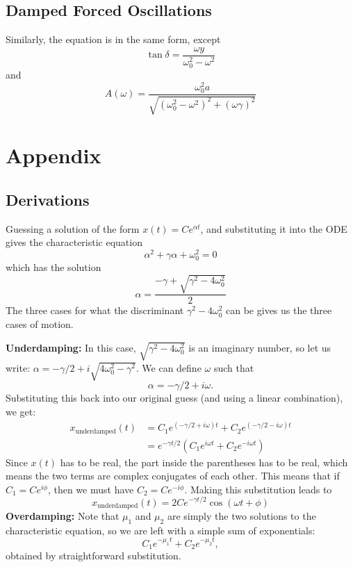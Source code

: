 \documentclass{article}
\begin{document}
\subsection{Damped Forced Oscillations}
Similarly, the equation is in the same form, except 
\begin{equation}
    \tan\delta = \frac{\omega y}{\omega_0^2-\omega^2}
\end{equation}
and 
\begin{equation}
    A(\omega) = \frac{\omega_0^2 a}{\sqrt{(\omega_0^2-\omega^2)^2 + (\omega \gamma)^2}}
\end{equation}
\section{Appendix}
\subsection{Derivations}
Guessing a solution of the form $x(t)=Ce^{\alpha t}$, and substituting it into the ODE gives the characteristic equation 
\begin{equation}
    \alpha^2 + \gamma \alpha + \omega_0^2 = 0
\end{equation}
which has the solution 
\begin{equation}
    \alpha = \frac{-\gamma + \sqrt{\gamma^2 - 4\omega_0^2}}{2}
\end{equation}
The three cases for what the discriminant $\gamma^2-4\omega_0^2$ can be gives us the three cases of motion.

\textbf{Underdamping:} In this case, $\sqrt{\gamma^2-4\omega_0^2}$ is an imaginary number, so let us write: $\alpha = -\gamma/2 + i\sqrt{4\omega_0^2-\gamma^2}$. We can define $\omega$ such that 
\begin{equation}
    \alpha = -\gamma/2 + i\omega.
\end{equation}
Substituting this back into our original guess (and using a linear combination), we get: 
\begin{align}
    x_\text{underdamped}(t) &= C_1e^{(-\gamma/2 + i\omega)t}+C_2e^{(-\gamma/2 - i\omega)t} \\ 
    &= e^{-\gamma t/2}\left(C_1e^{i\omega t} + C_2e^{-i\omega t}\right)
\end{align}
Since $x(t)$ has to be real, the part inside the parentheses has to be real, which means the two terms are complex conjugates of each other. This means that if $C_1=Ce^{i\phi}$, then we must have $C_2 =Ce^{-i\phi}$. Making this substitution leads to 
\begin{equation}
    x_\text{underdamped}(t) = 2Ce^{-\gamma t/2}\cos(\omega t+\phi)
\end{equation}
\textbf{Overdamping:} Note that $\mu_1$ and $\mu_2$ are simply the two solutions to the characteristic equation, so we are left with a simple sum of exponentials: 
\begin{equation}
    C_1e^{-\mu_1 t} + C_2e^{-\mu_2 t},
\end{equation}
obtained by straightforward substitution.
\end{document}
